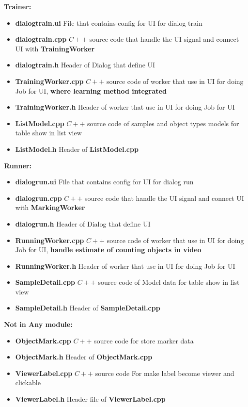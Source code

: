 \textbf{Trainer: }
\begin{itemize}
  \item \textbf{dialogtrain.ui} File that contains config for UI for dialog train
  \item \textbf{dialogtrain.cpp} $C++$ source code that handle the UI signal and connect UI with \textbf{TrainingWorker}
  \item \textbf{dialogtrain.h} Header of Dialog that define UI
  \item \textbf{TrainingWorker.cpp} $C++$ source code of worker that use in UI for doing Job for UI, \textbf{where learning method integrated}
  \item \textbf{TrainingWorker.h} Header of worker that use in UI for doing Job for UI
  \item \textbf{ListModel.cpp} $C++$ source code of samples and object types models for table show in list view 
  \item \textbf{ListModel.h} Header of \textbf{ListModel.cpp}
\end{itemize}

\textbf{Runner: }
\begin{itemize}
  \item \textbf{dialogrun.ui} File that contains config for UI for dialog run
  \item \textbf{dialogrun.cpp} $C++$ source code that handle the UI signal and connect UI with \textbf{MarkingWorker}
  \item \textbf{dialogrun.h} Header of Dialog that define UI
  \item \textbf{RunningWorker.cpp} $C++$ source code of worker that use in UI for doing Job for UI, \textbf{handle estimate of counting objects in video}
  \item \textbf{RunningWorker.h} Header of worker that use in UI for doing Job for UI
  \item \textbf{SampleDetail.cpp} $C++$ source code of Model data for table show in list view 
  \item \textbf{SampleDetail.h} Header of \textbf{SampleDetail.cpp}
\end{itemize}

\textbf{Not in Any module: }
\begin{itemize}
  \item \textbf{ObjectMark.cpp} $C++$ source code for store marker data 
  \item \textbf{ObjectMark.h} Header of \textbf{ObjectMark.cpp}
  \item \textbf{ViewerLabel.cpp} $C++$ source code For make label become viewer and clickable 
  \item \textbf{ViewerLabel.h} Header file of \textbf{ViewerLabel.cpp}
\end{itemize}

